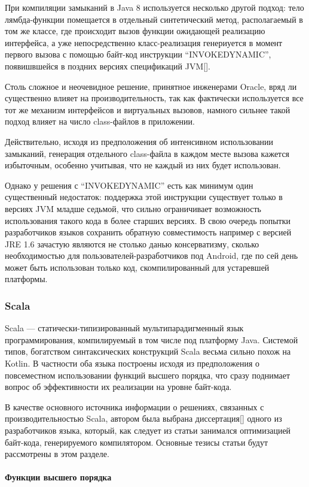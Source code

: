 При компиляции замыканий в Java 8 используется несколько другой подход: тело лямбда-функции
помещается в отдельный синтетический метод, располагаемый в том же классе, где происходит вызов
функции ожидающей реализацию интерфейса, а уже непосредственно класс-реализация генериуется
в момент первого вызова с помощью байт-код инструкции ``INVOKEDYNAMIC'', появишвшейся в поздних
версиях спецификаций JVM[]. %

Столь сложное и неочевидное решение, принятное инженерами Oracle, вряд ли существенно влияет на
производительность, так как фактически используется все тот же механизм интерфейсов и виртуальных
вызовов, намного сильнее такой подход влияет на число class-файлов в приложении.

Действительно, исходя из предположения об интенсивном использовании замыканий, генерация отдельного
class-файла в каждом месте вызова кажется избыточным, особенно учитывая, что не каждый из них
будет использован.

Однако у решения с ``INVOKEDYNAMIC'' есть как минимум один существенный недостаток: поддержка этой
инструкции существует только в версиях JVM младше седьмой, что сильно ограничивает возможность
использования такого кода в более старших версиях. В свою очередь попытки разработчиков языков
сохранить обратную совместимость например с версией JRE 1.6 зачастую являются не столько данью
консерватизму, сколько необходимостью для пользователей-разработчиков под Android, где по сей день
может быть использован только код, скомпилированный для устаревшей платформы.

\subsubsection{Scala}
Scala --- статически-типизированный мультипарадигменный язык программирования, компилируемый
в том числе под платформу Java. Системой типов, богатством синтаксических конструкций Scala
весьма сильно похож на Kotlin. В частности оба языка построены исходя из предположения
о повсеместном использовании функций высшего порядка, что сразу поднимает вопрос об эффективности
их реализации на уровне байт-кода.

В качестве основного источника информации о решениях, связанных с производительностью Scala,
автором была выбрана диссертация[] одного из разработчиков языка, который, как следует из статьи
занимался оптимизацией байт-кода, генерируемого компилятором.
Основные тезисы статьи будут рассмотрены в этом разделе.

\paragraph{Функции высшего порядка}
